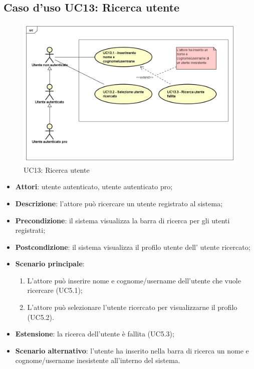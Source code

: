 \newpage
\subsection{Caso d'uso UC13: Ricerca utente}
\label{UC11}
\begin{figure}[h]
	\centering
	\includegraphics[scale=0.5]{UML/UC13.png}
	\caption{UC13: Ricerca utente}
\end{figure}
\FloatBarrier
\begin{itemize}
	\item \textbf{Attori}: utente autenticato, utente autenticato pro;
	\item \textbf{Descrizione}: l'attore può ricercare un utente registrato al sistema;
	\item \textbf{Precondizione}: il sistema visualizza la barra di ricerca per gli utenti registrati;
	\item \textbf{Postcondizione}: il sistema visualizza il profilo utente dell' utente ricercato;
	\item \textbf{Scenario principale}:
	\begin{enumerate}
		\item L'attore può inserire nome e cognome/username dell'utente che vuole ricercare (UC5.1);
		\item L'attore può selezionare l'utente ricercato per visualizzarne il profilo (UC5.2).
	\end{enumerate} 
	\item \textbf{Estensione}: la ricerca dell'utente è fallita (UC5.3);
	\item \textbf{Scenario alternativo}: l'utente ha inserito nella barra di ricerca un nome e cognome/username inesistente all'interno del sistema. 
\end{itemize}

